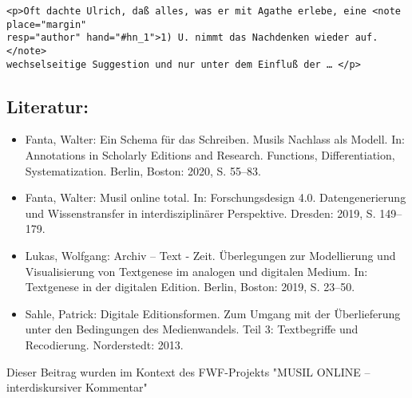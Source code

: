 \documentclass{article}
\begin{document}
        \begin{verbatim}<p>Oft dachte Ulrich, daß alles, was er mit Agathe erlebe, eine <note place="margin" 
resp="author" hand="#hn_1">1) U. nimmt das Nachdenken wieder auf.</note> 
wechselseitige Suggestion und nur unter dem Einfluß der … </p>\end{verbatim}\subsection*{Literatur:}\begin{itemize}\item Fanta, Walter: Ein Schema für das Schreiben. Musils Nachlass als
                              Modell. In: Annotations in Scholarly Editions and Research.
                              Functions, Differentiation, Systematization. Berlin, Boston: 2020, S. 55–83.\item Fanta, Walter: Musil online total. In: Forschungsdesign 4.0. Datengenerierung und
                              Wissenstransfer in interdisziplinärer Perspektive. Dresden: 2019, S. 149–179.\item Lukas, Wolfgang: Archiv – Text - Zeit. Überlegungen zur Modellierung und
                              Visualisierung von Textgenese im analogen und digitalen Medium. In: Textgenese in der digitalen Edition. Berlin, Boston: 2019, S. 23–50.\item Sahle, Patrick: Digitale Editionsformen. Zum Umgang mit der
                              Überlieferung unter den Bedingungen des Medienwandels. Teil 3:
                              Textbegriffe und Recodierung. Norderstedt: 2013.\end{itemize}Dieser Beitrag wurden im Kontext des FWF-Projekts "MUSIL ONLINE – interdiskursiver Kommentar" 
\end{document}
